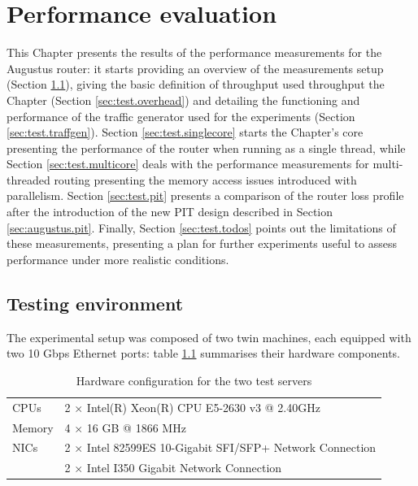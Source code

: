 \documentclass[11pt,a4paper,twoside,titlepage,openany]{book}
\begin{document}

\chapter{Performance evaluation}
\label{chap:test}

This Chapter presents the results of the performance measurements for the Augustus router: it starts providing an overview of the measurements setup (Section \ref{sec:test.env}), giving the basic definition of throughput used throughput the Chapter (Section \ref{sec:test.overhead}) and detailing the functioning and performance of the traffic generator used for the experiments (Section \ref{sec:test.traffgen}).
Section \ref{sec:test.singlecore} starts the Chapter's core presenting the performance of the router when running as a single thread, while Section \ref{sec:test.multicore} deals with the performance measurements for multi-threaded routing presenting the memory access issues introduced with parallelism.
Section \ref{sec:test.pit} presents a comparison of the router loss profile after the introduction of the new PIT design described in Section \ref{sec:augustus.pit}.
Finally, Section \ref{sec:test.todos} points out the limitations of these measurements, presenting a plan for further experiments useful to assess performance under more realistic conditions.

\section{Testing environment}\label{sec:test.env}
The experimental setup was composed of two twin machines, each equipped with two 10 Gbps Ethernet ports:
table \ref{tab:test.hw} summarises their hardware components.

\begin{table}[tb]
  \begin{center}
    \begin{tabular}{ll}
      \toprule
      CPUs   & 2 $\times$ Intel(R) Xeon(R) CPU E5-2630 v3 @ 2.40GHz \\
      Memory & 4 $\times$ 16 GB @ 1866 MHz\\
      NICs   & 2 $\times$ Intel 82599ES 10-Gigabit SFI/SFP+ Network Connection \\
             & 2 $\times$ Intel I350 Gigabit Network Connection \\
      \bottomrule
    \end{tabular}
  \end{center}
  \caption{Hardware configuration for the two test servers}
  \label{tab:test.hw}
\end{table}
\end{document}
